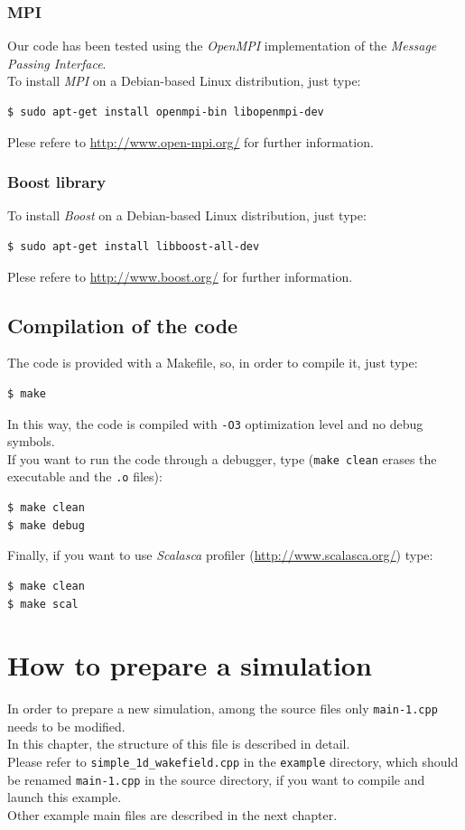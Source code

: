 \documentclass[11pt,a4paper]{report}
\begin{document}
\subsection{MPI}
Our code has been tested using the \emph{OpenMPI} implementation of the \emph{Message Passing Interface}. \\
To install \emph{MPI} on a Debian-based Linux distribution, just type: 
\begin{verbatim}
$ sudo apt-get install openmpi-bin libopenmpi-dev
\end{verbatim}
Plese refere to \url{http://www.open-mpi.org/} for further information.

\subsection{Boost library}
To install \emph{Boost} on a Debian-based Linux distribution, just type: 
\begin{verbatim}
$ sudo apt-get install libboost-all-dev
\end{verbatim}
Plese refere to \url{http://www.boost.org/} for further information.


\section{Compilation of the code}
The code is provided with a Makefile, so, in order to compile it, just type:
\begin{verbatim}
$ make
\end{verbatim}
In this way, the code is compiled with \verb+-O3+ optimization level and no debug symbols.\\
If you want to run the code through a debugger, type (\verb+make clean+ erases the executable and the \verb+.o+ files):
\begin{verbatim}
$ make clean
$ make debug
\end{verbatim}
Finally, if you want to use \emph{Scalasca} profiler (\url{http://www.scalasca.org/}) type:
\begin{verbatim}
$ make clean
$ make scal
\end{verbatim}

\chapter{How to prepare a simulation}
In order to prepare a new simulation, among the source files only \verb+main-1.cpp+ needs to be modified.\\
In this chapter, the structure of this file is described in detail.\\
Please refer to \verb+simple_1d_wakefield.cpp+ in the \verb+example+ directory, which should be renamed \verb+main-1.cpp+ in the source directory, if you want to compile and launch this example. \\
Other example main files are described in the next chapter.
\end{document}
